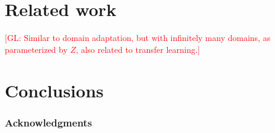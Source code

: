 \documentclass{article}
\newcommand{\glnote}[1]{\textcolor{red}{[GL: #1]}}
\theoremstyle{plain}
\begin{document}
\section{Related work}

\glnote{Similar to domain adaptation, but with infinitely many domains,
as parameterized by $Z$, also related to transfer learning.}

\section{Conclusions}

\subsubsection*{Acknowledgments}


{\small
}
\end{document}
